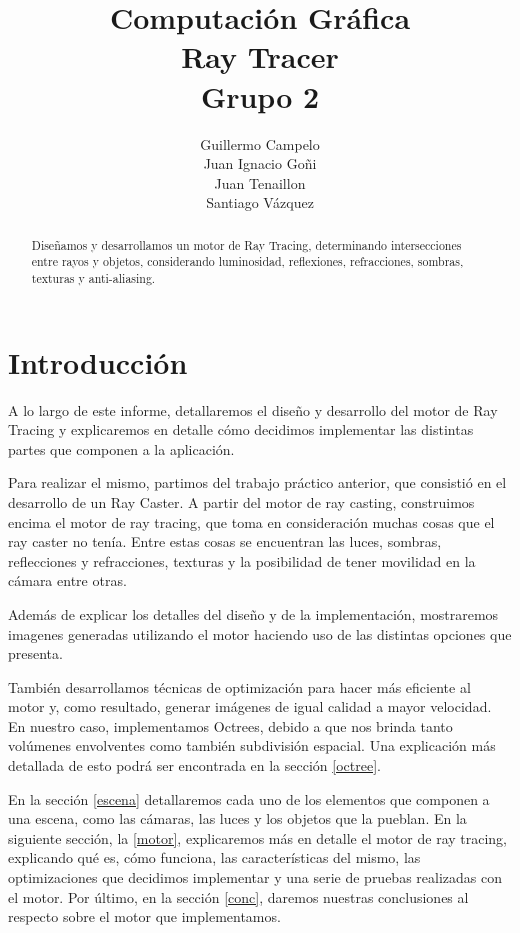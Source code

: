 \documentclass[a4paper,10pt]{article}
\title{Computaci\'on Gr\'afica \\Ray Tracer \\Grupo 2}
\author{Guillermo Campelo\\Juan Ignacio Go\~ni\\Juan Tenaillon\\Santiago
V\'azquez}
\begin{document}
\maketitle

\begin{abstract}
Dise\~namos y desarrollamos un motor de Ray Tracing, determinando
intersecciones entre rayos y objetos, considerando luminosidad, reflexiones,
refracciones, sombras, texturas y anti-aliasing. 
\end{abstract}

\section{Introducci\'on}
\label{intro}
A lo largo de este informe, detallaremos el dise\~no y desarrollo del motor de
Ray Tracing y explicaremos en detalle c\'omo decidimos implementar las distintas
partes que componen a la aplicaci\'on.

Para realizar el mismo, partimos del trabajo pr\'actico anterior, que
consisti\'o en
el desarrollo de un Ray Caster.  A partir del motor de ray casting,
construimos encima
el motor de ray tracing, que toma en consideraci\'on muchas cosas que el ray
caster no ten\'ia.
Entre estas cosas se encuentran las luces, sombras, reflecciones y refracciones,
texturas y la
posibilidad de tener movilidad en la c\'amara entre otras.

Adem\'as de explicar los detalles del dise\~no y de la implementaci\'on,
mostraremos imagenes generadas utilizando el motor haciendo uso de las distintas
opciones que presenta.

Tambi\'en desarrollamos t\'ecnicas de optimizaci\'on para hacer m\'as eficiente
al motor y, como resultado, generar im\'agenes de igual calidad a mayor
velocidad.  En nuestro caso, implementamos Octrees, debido a que nos brinda
tanto vol\'umenes envolventes como tambi\'en subdivisi\'on espacial.  Una
explicaci\'on m\'as detallada de esto podr\'a ser encontrada en la secci\'on
\ref{octree}.

En la secci\'on \ref{escena} detallaremos cada uno de los elementos que componen
a una escena, como las c\'amaras, las luces y los objetos que la pueblan.  En la
siguiente secci\'on, la \ref{motor}, explicaremos m\'as en detalle el motor de
ray tracing, explicando qu\'e es, c\'omo funciona, las caracter\'isticas del
mismo, las optimizaciones que decidimos implementar y una serie de pruebas
realizadas con el motor.
Por \'ultimo, en la secci\'on \ref{conc},
daremos nuestras conclusiones al respecto sobre el motor que implementamos.
\end{document}
